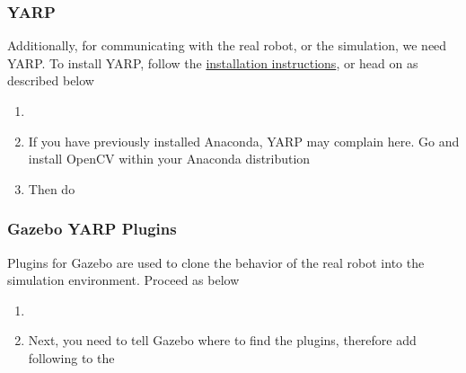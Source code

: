 \subsubsection{YARP}
Additionally, for communicating with the real robot, or the simulation, we need YARP. To install YARP, follow the \href{https://www.yarp.it/install.html}{installation instructions}, or head on as described below
\begin{enumerate}
	\item {}
	\newline {}
	\item If you have previously installed Anaconda, YARP may complain here. Go and install OpenCV within your Anaconda distribution
	\newline {}
	\newline {}
	\newline {}
	\item Then do
	\newline {}
	\newline {}
	\newline {}
\end{enumerate}
\FloatBarrier
\subsubsection{Gazebo YARP Plugins}
Plugins for Gazebo are used to clone the behavior of the real robot into the simulation environment. Proceed as below
\begin{enumerate}
	\item {}
	\newline {}
	\newline {}
	\newline {}
	\newline {}
	\newline {}
	\item Next, you need to tell Gazebo where to find the plugins, therefore add following to the 
	\newline {}
	\newline {}
\end{enumerate}
\FloatBarrier
